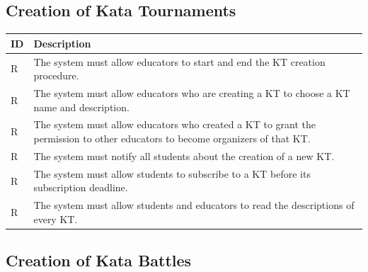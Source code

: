 \documentclass[11pt]{report}
\newcounter{rcounter}
\newcommand{\rc}{
    \addtocounter{rcounter}{1}
    R\arabic{rcounter}
}
\begin{document}
\subsection*{Creation of Kata Tournaments}

\begin{longtable}[h] {|p{10mm}|p{130mm}|}
    \hline
    \rowcolor{gray!20}
    \textbf{ID} & \textbf{Description} \\ \hline
    \rc & The system must allow educators to start and end the KT creation procedure\@.
    \\ \hline
    \rc & The system must allow educators who are creating a KT to choose a KT name and description.
    \\ \hline
    \rc & The system must allow educators who created a KT to grant the permission to other educators to become organizers of that KT\@.
    \\ \hline
    \rc & The system must notify all students about the creation of a new KT\@.
    \\ \hline
    \rc & The system must allow students to subscribe to a KT before its subscription deadline.
    \\ \hline
    \rc & The system must allow students and educators to read the descriptions of every KT\@.
    \\ \hline
\end{longtable}

\subsection*{Creation of Kata Battles}
\end{document}
